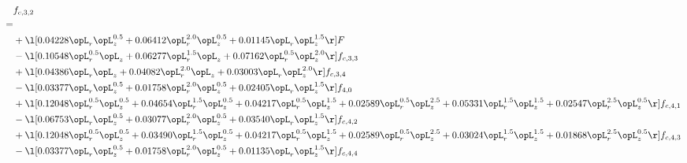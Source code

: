 \begin{alignat}{2} 
\label{eq:f_32_2} 
& f_{c,3,2} \nonumber \\ 
 = \\ 
& + \l[  0.04228 \opL_r \opL_z^{0.5} +  0.06412 \opL_r^{2.0} \opL_z^{0.5} +  0.01145 \opL_r \opL_z^{1.5}  \r] F \nonumber \\ 
& - \l[  0.10548 \opL_r^{0.5} \opL_z +  0.06277 \opL_r^{1.5} \opL_z +  0.07162 \opL_r^{0.5} \opL_z^{2.0}  \r] f_{c,3,3} \nonumber \\ 
& + \l[  0.04386 \opL_r \opL_z +  0.04082 \opL_r^{2.0} \opL_z +  0.03003 \opL_r \opL_z^{2.0}  \r] f_{c,3,4} \nonumber \\ 
& - \l[  0.03377 \opL_r \opL_z^{0.5} +  0.01758 \opL_r^{2.0} \opL_z^{0.5} +  0.02405 \opL_r \opL_z^{1.5}  \r] f_{4,0} \nonumber \\ 
& + \l[  0.12048 \opL_r^{0.5} \opL_z^{0.5} +  0.04654 \opL_r^{1.5} \opL_z^{0.5} +  0.04217 \opL_r^{0.5} \opL_z^{1.5} +  0.02589 \opL_r^{0.5} \opL_z^{2.5} +  0.05331 \opL_r^{1.5} \opL_z^{1.5} +  0.02547 \opL_r^{2.5} \opL_z^{0.5}  \r] f_{c,4,1} \nonumber \\ 
& - \l[  0.06753 \opL_r \opL_z^{0.5} +  0.03077 \opL_r^{2.0} \opL_z^{0.5} +  0.03540 \opL_r \opL_z^{1.5}  \r] f_{c,4,2} \nonumber \\ 
& + \l[  0.12048 \opL_r^{0.5} \opL_z^{0.5} +  0.03490 \opL_r^{1.5} \opL_z^{0.5} +  0.04217 \opL_r^{0.5} \opL_z^{1.5} +  0.02589 \opL_r^{0.5} \opL_z^{2.5} +  0.03024 \opL_r^{1.5} \opL_z^{1.5} +  0.01868 \opL_r^{2.5} \opL_z^{0.5}  \r] f_{c,4,3} \nonumber \\ 
& - \l[  0.03377 \opL_r \opL_z^{0.5} +  0.01758 \opL_r^{2.0} \opL_z^{0.5} +  0.01135 \opL_r \opL_z^{1.5}  \r] f_{c,4,4} \nonumber \\ 
\end{alignat} 


